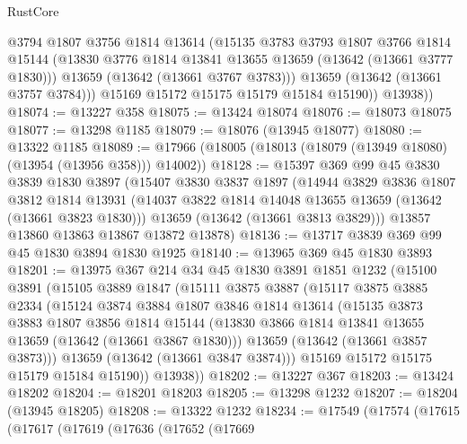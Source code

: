 \begin{lexlean}{RustCore}
\begin{coremodule}
              @3794
              @1807
              @3756
              @1814
              @13614
              (@15135
                @3783
                @3793
                @1807
                @3766
                @1814
                @15144
                (@13830 @3776 @1814 @13841 @13655 @13659 (@13642 (@13661 @3777 @1830)))
                @13659
                (@13642 (@13661 @3767 @3783)))
              @13659
              (@13642 (@13661 @3757 @3784)))
            @15169
            @15172
            @15175
            @15179
            @15184
            @15190))
        @13938))
@18074 := @13227 @358
@18075 := @13424 @18074
@18076 := @18073 @18075
@18077 := @13298 @1185
@18079 := @18076 (@13945 @18077)
@18080 := @13322 @1185
@18089 := @17966 (@18005 (@18013 (@18079 (@13949 @18080) (@13954 (@13956 @358))) @14002))
@18128 := @15397
    @369
    @99
    @45
    @3830
    @3839
    @1830
    @3897
    (@15407
      @3830
      @3837
      @1897
      (@14944
        @3829
        @3836
        @1807
        @3812
        @1814
        @13931
        (@14037 @3822 @1814 @14048 @13655 @13659 (@13642 (@13661 @3823 @1830)))
        @13659
        (@13642 (@13661 @3813 @3829)))
      @13857
      @13860
      @13863
      @13867
      @13872
      @13878)
@18136 := @13717 @3839 @369 @99 @45 @1830 @3894 @1830 @1925
@18140 := @13965 @369 @45 @1830 @3893
@18201 := @13975
    @367
    @214
    @34
    @45
    @1830
    @3891
    @1851
    @1232
    (@15100
      @3891
      (@15105
        @3889
        @1847
        (@15111
          @3875
          @3887
          (@15117
            @3875
            @3885
            @2334
            (@15124
              @3874
              @3884
              @1807
              @3846
              @1814
              @13614
              (@15135
                @3873
                @3883
                @1807
                @3856
                @1814
                @15144
                (@13830 @3866 @1814 @13841 @13655 @13659 (@13642 (@13661 @3867 @1830)))
                @13659
                (@13642 (@13661 @3857 @3873)))
              @13659
              (@13642 (@13661 @3847 @3874)))
            @15169
            @15172
            @15175
            @15179
            @15184
            @15190))
        @13938))
@18202 := @13227 @367
@18203 := @13424 @18202
@18204 := @18201 @18203
@18205 := @13298 @1232
@18207 := @18204 (@13945 @18205)
@18208 := @13322 @1232
@18234 := @17549
    (@17574
      (@17615
        (@17617
          (@17619
            (@17636
              (@17652
                (@17669

\end{coremodule}
\end{lexlean}
